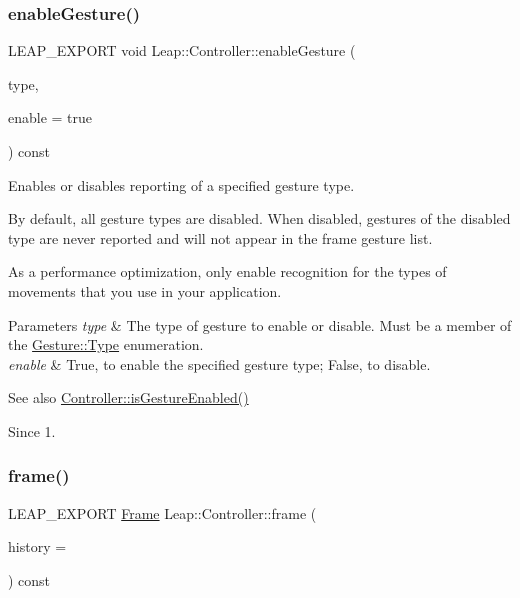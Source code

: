 \subsubsection{\texorpdfstring{enable\+Gesture()}{enableGesture()}}
{\footnotesize\ttfamily L\+E\+A\+P\+\_\+\+E\+X\+P\+O\+RT void Leap\+::\+Controller\+::enable\+Gesture (\begin{DoxyParamCaption}\item[{\hyperlink{class_leap_1_1_gesture_a6fa6dd4f28c502f0d55abc6b71c6f9b1}{Gesture\+::\+Type}}]{type,  }\item[{bool}]{enable = {\ttfamily true} }\end{DoxyParamCaption}) const}

Enables or disables reporting of a specified gesture type.

By default, all gesture types are disabled. When disabled, gestures of the disabled type are never reported and will not appear in the frame gesture list.


\begin{DoxyCodeInclude}
\end{DoxyCodeInclude}


As a performance optimization, only enable recognition for the types of movements that you use in your application.


\begin{DoxyParams}{Parameters}
{\em type} & The type of gesture to enable or disable. Must be a member of the \hyperlink{class_leap_1_1_gesture_a6fa6dd4f28c502f0d55abc6b71c6f9b1}{Gesture\+::\+Type} enumeration. \\
\hline
{\em enable} & True, to enable the specified gesture type; False, to disable. \\
\hline
\end{DoxyParams}
\begin{DoxySeeAlso}{See also}
\hyperlink{class_leap_1_1_controller_ada988c262060d8b3beba2d6d995ed345}{Controller\+::is\+Gesture\+Enabled()} 
\end{DoxySeeAlso}
\begin{DoxySince}{Since}
1. 
\end{DoxySince}
\mbox{\label{class_leap_1_1_controller_acb45e24fc2583045212f2cfec613f5b0}} 
\subsubsection{\texorpdfstring{frame()}{frame()}}
{\footnotesize\ttfamily L\+E\+A\+P\+\_\+\+E\+X\+P\+O\+RT \hyperlink{class_leap_1_1_frame}{Frame} Leap\+::\+Controller\+::frame (\begin{DoxyParamCaption}\item[{int}]{history = {} }\end{DoxyParamCaption}) const}

